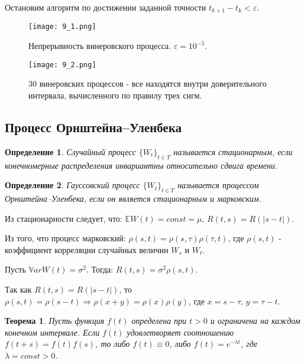 \documentclass[a4paper, 11pt]{article}
\theoremstyle{def}
\newtheorem{definition}{Определение}[section]
\theoremstyle{th}
\newtheorem{theorem}{Теорема}[section]
\theoremstyle{rem}
\begin{document}
Остановим алгоритм по достижении заданной точности $t_{k+1} - t_k < \varepsilon$.

\begin{figure}[H]
        \noindent
        \centering
        {
                \texttt{[image: 9\_1.png]}
        }
        \caption{Непрерывность винеровского процесса. $\varepsilon = 10^{-5}$.}
\end{figure}
\begin{figure}[H]
        \noindent
        \centering
        {
                \texttt{[image: 9\_2.png]}
        }
        \caption{30 винеровских процессов - все находятся внутри доверительного интервала, вычисленного по правилу трех сигм.}
\end{figure}

\subsection{Процесс Орнштейна--Уленбека}

\begin{definition}
        Случайный процесс $\{W_t\}_{t\in T}$ называется \textit{стационарным}, если конечномерные распределения инвариантны относительно сдвига времени.
\end{definition}

\begin{definition}
        Гауссовский процесс $\{W_t\}_{t\in T}$ называется \textit{процессом Орнштейна--Уленбека}, если он является стационарным и марковским.
\end{definition}

Из стационарности следует, что: $\mathbb{E}W(t) = const = \mu, \, R(t, s) = R(|s-t|)$.

Из того, что процесс марковский: $\rho(s, t) = \rho(s, \tau)\rho(\tau, t)$, где $\rho(s, t)$ - коэффициент корреляции случайных величин $W_s$ и $W_t$.

Пусть $\mathbb{V}ar W(t) = \sigma^2$. Тогда: $R(t, s) = \sigma^2 \rho(s, t)$.

Так как $R(t, s) = R(|s-t|)$, то $\rho(s, t) = \rho(s-t) \Rightarrow \rho(x+y) = \rho(x)\rho(y)$, где $x = s-\tau, \, y = \tau-t$.

\begin{theorem}
        Пусть функция $f(t)$ определена при $t>0$ и ограничена на каждом конечном интервале. Если $f(t)$ удовлетворяет соотношению $f(t+s)=f(t)f(s)$, то либо $f(t) \equiv 0$, либо $f(t) = e^{-\lambda t}$, где $\lambda = const > 0$.
\end{theorem}
\end{document}
